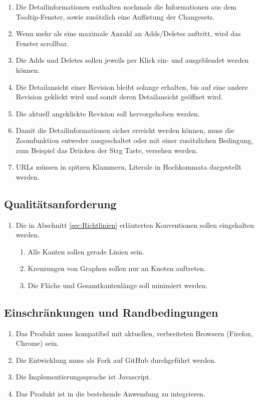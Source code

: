 \documentclass[nocolor]{tudbook}
\begin{document}
\begin{enumerate}[F1]
\begin{enumerate}[{F3}.1]
	\item Die Detailinformationen enthalten nochmals die Informationen aus dem Tooltip-Fenster, sowie zusätzlich eine Auflistung der Changesets.
	\item Wenn mehr als eine maximale Anzahl an Adds/Deletes auftritt, wird das Fenster scrollbar.
	\item Die Adds und Deletes sollen jeweils per Klick ein- und ausgeblendet werden können.
	\item Die Detailansicht einer Revision bleibt solange erhalten, bis auf eine andere Revision geklickt wird und somit deren Detailansicht geöffnet wird.
	\item Die aktuell angeklickte Revision soll hervorgehoben werden.
	\item Damit die Detailinformationen sicher erreicht werden können, muss die Zoomfunktion entweder ausgeschaltet oder mit einer zusätzlichen Bedingung, zum Beispiel das Drücken der \glqq Strg\grqq{} Taste, versehen werden. 
	\item URLs müssen in spitzen Klammern, Literale in Hochkommata dargestellt werden.
	\end{enumerate}
\end{enumerate}

\subsection{Qualitätsanforderung}
\begin{enumerate}[Q1]
	\item Die in Abschnitt \ref{sec:Richtlinien} erläuterten Konventionen sollen eingehalten werden.
	\begin{enumerate}[{Q1}.1]
		\item Alle Kanten sollen gerade Linien sein.
		\item Kreuzungen von Graphen sollen nur an Knoten auftreten.
		\item Die Fläche und Gesamtkantenlänge soll minimiert werden.
	\end{enumerate}
\end{enumerate}

\subsection{Einschränkungen und Randbedingungen}
\begin{enumerate}[R1]
	\item Das Produkt muss kompatibel mit aktuellen, verbreiteten Browsern (Firefox, Chrome) sein.
	\item Die Entwicklung muss als Fork auf GitHub durchgeführt werden.
	\item Die Implementierungssprache ist Javascript.
	\item Das Produkt ist in die bestehende Anwendung zu integrieren.
\end{enumerate}
\end{document}

